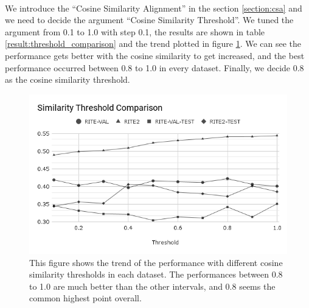 \documentclass[12pt]{article}
\begin{document}
\begin{CJK*}{UTF8}{bkai}
\begin{spacing}{1.77}
\paragraph{}
We introduce the ``Cosine Similarity Alignment'' in the section \ref{section:csa} and we need to decide the argument ``Cosine Similarity Threshold''. We tuned the argument from 0.1 to 1.0 with step 0.1, the results are shown in table \ref{result:threshold_comparison} and the trend plotted in figure \ref{fig:threshold}. We can see the performance gets better with the cosine similarity to get increased, and the best performance occurred between 0.8 to 1.0 in every dataset. Finally, we decide 0.8 as the cosine similarity threshold.

\begin{figure}
  \centering
  \includegraphics[width=15cm]{SimThresholdComp.png}
  \caption[Cosine Similarity Threshold Comparison]{This figure shows the trend of the performance with different cosine similarity thresholds in each dataset. The performances between 0.8 to 1.0 are much better than the other intervals, and 0.8 seems the common highest point overall.}
  \label{fig:threshold}
\end{figure}


\end{spacing}
\end{CJK*}
\end{document}
